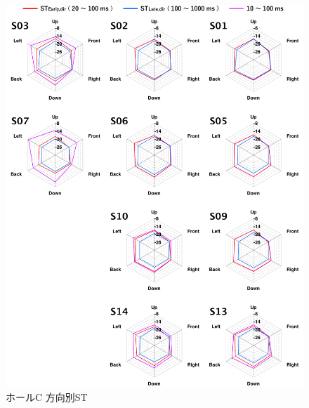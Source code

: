 \documentclass[11pt,a4j]{jreport}
\begin{document}
\newpage
\begin{figure}[H]
  \centering
  \includegraphics[scale=.75]{images/realHallDirSt/allPoint/reshaped/c.pdf}
  \caption{ホールC 方向別ST}
  \label{fig:ホールC 方向別ST}
\end{figure}
\end{document}
